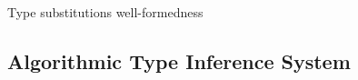 \begin{rules}{Type substitutions well-formedness}{\Sigma \vdash \theta}
    \begin{minipage}{.25\linewidth}
        \infrule[Sw$_{\emptyset}$]{
            \vdash \Sigma
        }{
            \Sigma \vdash \emptyset
        }
    \end{minipage}
    \begin{minipage}{.65\linewidth}
    \end{minipage}
    \begin{minipage}{.65\linewidth}
    \end{minipage}
\end{rules}





























\subsection{\vlmini{} Algorithmic Type Inference System}
\label{appendix:typing_vlmini}

